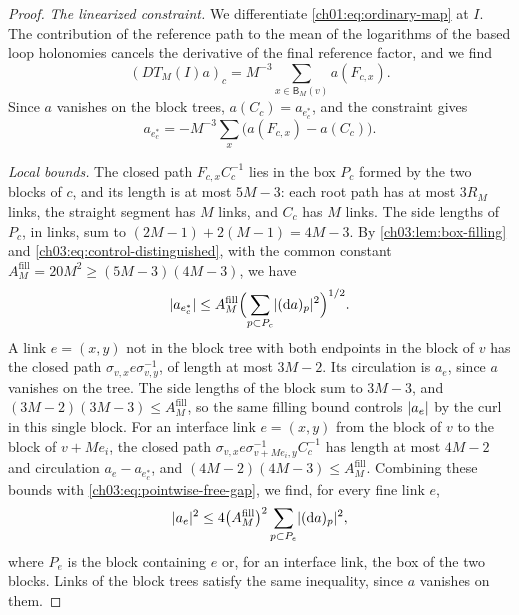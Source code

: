 \begin{proof}
\emph{The linearized constraint.} We differentiate \eqref{ch01:eq:ordinary-map} at $I$. The contribution of the reference path to the mean of the logarithms of the based loop holonomies cancels the derivative of the final reference factor, and we find
\begin{equation}\label{ch03:eq:flat-constraint}
 (DT_M(I)a)_c=M^{-3}\sum_{x\in\mathsf B_M(v)}a(F_{c,x}).
\end{equation}
Since $a$ vanishes on the block trees, $a(C_c)=a_{e^*_c}$, and the constraint gives
\begin{equation}\label{ch03:eq:control-distinguished}
 a_{e^*_c}=-M^{-3}\sum_x\bigl(a(F_{c,x})-a(C_c)\bigr).
\end{equation}

\emph{Local bounds.} The closed path $F_{c,x}C_c^{-1}$ lies in the box $P_c$ formed by the two blocks of $c$, and its length is at most $5M-3$: each root path has at most $3R_M$ links, the straight segment has $M$ links, and $C_c$ has $M$ links. The side lengths of $P_c$, in links, sum to $(2M-1)+2(M-1)=4M-3$. By \cref{ch03:lem:box-filling} and \eqref{ch03:eq:control-distinguished}, with the common constant $A_M^{\mathrm{fill}}=20M^2\ge(5M-3)(4M-3)$, we have
\begin{equation}\label{ch03:eq:pointwise-free-gap}
 \lvert a_{e^*_c}\rvert\le A_M^{\mathrm{fill}}\Bigl(\sum_{p\subset P_c}\lvert (\mathrm da)_p\rvert^2\Bigr)^{1/2}.
\end{equation}
A link $e=(x,y)$ not in the block tree with both endpoints in the block of $v$ has the closed path $\sigma_{v,x}e\sigma_{v,y}^{-1}$, of length at most $3M-2$. Its circulation is $a_e$, since $a$ vanishes on the tree. The side lengths of the block sum to $3M-3$, and $(3M-2)(3M-3)\le A_M^{\mathrm{fill}}$, so the same filling bound controls $\lvert a_e\rvert$ by the curl in this single block. For an interface link $e=(x,y)$ from the block of $v$ to the block of $v+Me_i$, the closed path $\sigma_{v,x}e\sigma_{v+Me_i,y}^{-1}C_c^{-1}$ has length at most $4M-2$ and circulation $a_e-a_{e^*_c}$, and $(4M-2)(4M-3)\le A_M^{\mathrm{fill}}$. Combining these bounds with \eqref{ch03:eq:pointwise-free-gap}, we find, for every fine link $e$,
\begin{equation}\label{ch03:eq:edge-curl-bound}
 \lvert a_e\rvert^2\le4\bigl(A_M^{\mathrm{fill}}\bigr)^2\sum_{p\subset P_e}\lvert (\mathrm da)_p\rvert^2,
\end{equation}
where $P_e$ is the block containing $e$ or, for an interface link, the box of the two blocks. Links of the block trees satisfy the same inequality, since $a$ vanishes on them.


\end{proof}
